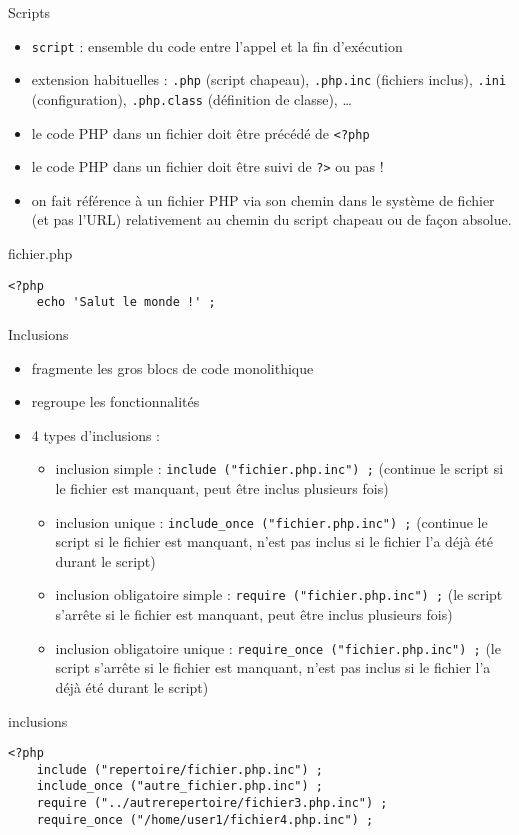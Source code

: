 \begin{frame}[containsverbatim]{Scripts}
	\begin{itemize}
		\item \texttt{script} : ensemble du code entre l'appel et la fin d'exécution
		\item extension habituelles : \texttt{.php} (script chapeau), \texttt{.php.inc} (fichiers inclus), \texttt{.ini} (configuration), \texttt{.php.class} (définition de classe), \ldots
		\item le code PHP dans un fichier doit être précédé de \texttt{<?php}
		\item le code PHP dans un fichier doit être suivi de \texttt{?>} ou pas !
		\item on fait référence à un fichier PHP via son chemin dans le système de fichier (et pas l'URL) relativement au chemin du script chapeau ou de façon absolue.
	\end{itemize}
	\begin{block}{fichier.php}
		\begin{lstlisting}
<?php
	echo 'Salut le monde !' ;
		\end{lstlisting}
	\end{block}
\end{frame}

\begin{frame}[containsverbatim]{Inclusions}
	\begin{itemize}
		\item fragmente les gros blocs de code monolithique
		\item regroupe les fonctionnalités
		\item 4 types d'inclusions :
		\begin{itemize}
			\item inclusion simple : \lstinline$include ("fichier.php.inc") ;$ (continue le script si le fichier est manquant, peut être inclus plusieurs fois)
			\item inclusion unique : \lstinline$include_once ("fichier.php.inc") ;$ (continue le script si le fichier est manquant, n'est pas inclus si le fichier l'a déjà été durant le script)
			\item inclusion obligatoire simple : \lstinline$require ("fichier.php.inc") ;$ (le script s'arrête si le fichier est manquant, peut être inclus plusieurs fois)
			\item inclusion obligatoire unique : \lstinline$require_once ("fichier.php.inc") ;$ (le script s'arrête si le fichier est manquant, n'est pas inclus si le fichier l'a déjà été durant le script)
		\end{itemize}
	\end{itemize}
	\begin{block}{inclusions}
		\begin{lstlisting}
<?php
	include ("repertoire/fichier.php.inc") ;
	include_once ("autre_fichier.php.inc") ;
	require ("../autrerepertoire/fichier3.php.inc") ;
	require_once ("/home/user1/fichier4.php.inc") ;
		\end{lstlisting}
	\end{block}
\end{frame}


